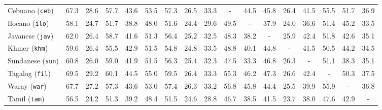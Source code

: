 \begin{table}[ht]
{\begin{tabular}{l *{16}{c}}
Cebuano (\texttt{ceb}) & 67.3 & 28.6 & 57.7 & 43.6 & 53.5 & 57.3 & 26.5 & 33.3 & - & 44.5 & 45.8 & 26.4 & 41.5 & 55.5 & 51.7 & 36.9 \\ %
Ilocano (\texttt{ilo}) & 58.1 & 24.7 & 51.7 & 38.8 & 48.0 & 51.6 & 24.4 & 29.6 & 49.5 & - & 37.9 & 24.0 & 36.6 & 51.4 & 45.2 & 33.5 \\ %
Javanese (\texttt{jav}) & 62.0 & 26.4 & 58.7 & 41.6 & 51.3 & 56.4 & 25.2 & 32.5 & 48.3 & 38.2 & - & 25.9 & 42.4 & 51.8 & 42.6 & 35.1 \\ %
Khmer (\texttt{khm}) & 59.6 & 26.4 & 55.5 & 42.9 & 51.5 & 54.8 & 24.8 & 33.5 & 48.8 & 40.1 & 44.8 & - & 41.5 & 50.5 & 44.2 & 34.5 \\ %
Sundanese (\texttt{sun}) & 60.8 & 26.0 & 59.0 & 41.9 & 51.5 & 56.3 & 25.4 & 32.3 & 47.5 & 33.3 & 46.8 & 26.3 & - & 51.1 & 38.3 & 35.1 \\ %
Tagalog (\texttt{fil}) & 69.5 & 29.2 & 60.1 & 44.5 & 55.0 & 59.5 & 26.4 & 33.3 & 55.3 & 46.2 & 47.3 & 26.6 & 42.4 & - & 50.3 & 37.5 \\ %
Waray (\texttt{war}) & 67.7 & 27.2 & 57.3 & 43.6 & 53.0 & 57.4 & 26.3 & 33.2 & 56.8 & 45.8 & 44.4 & 25.5 & 39.9 & 55.9 & - & 36.8 \\ %
Tamil (\texttt{tam}) & 56.5 & 24.2 & 51.3 & 39.2 & 48.4 & 51.5 & 24.6 & 28.8 & 46.7 & 38.5 & 41.5 & 23.7 & 38.0 & 47.6 & 42.9 & - \\ %
\bottomrule
\end{tabular}
}
\end{table}